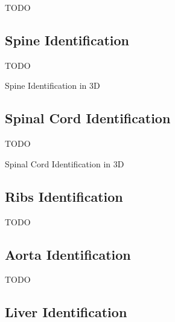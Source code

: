 TODO

\subsection{Spine Identification}

TODO

\begin{stulisting}[p]
\caption{Spine Identification in 3D}
\label{code:featureid-3d-spineidentification}

\end{stulisting}

\subsection{Spinal Cord Identification}

TODO

\begin{stulisting}[p]
\caption{Spinal Cord Identification in 3D}
\label{code:featureid-3d-spinalcordidentification}

\end{stulisting}

\subsection{Ribs Identification}
\label{subsec:featureid-3d-ribsidentification}

TODO

\subsection{Aorta Identification}

TODO

\subsection{Liver Identification}

